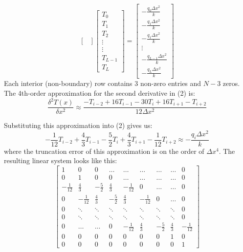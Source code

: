 \documentclass[letterpaper, 12pt]{article}
\begin{document}
\begin{flushleft}
\[\begin{bmatrix}
\end{bmatrix}
\begin{bmatrix}
    T_0 \\
    T_1 \\
    T_2 \\
    \vdots \\
    \vdots \\
    T_{L-1} \\
    T_L
\end{bmatrix}
=
\begin{bmatrix}
    - \frac{q_0 \Delta x^2}{k} \\
    - \frac{q_1 \Delta x^2}{k} \\
    - \frac{q_1 \Delta x^2}{k} \\
    \vdots \\
    - \frac{q_{L-1} \Delta x^2}{k} \\
    - \frac{q_L \Delta x^2}{k}
\end{bmatrix}
\]
Each interior (non-boundary) row contains 3 non-zero entries and $N-3$ zeros.
\vskip 5mm
The 4th-order approximation for the second derivative in (2) is:
\begin{equation}
    \frac{\delta^2 T(x)}{\delta x^2} \approx \frac{-T_{i-2} + 16T_{i-1} - 30T_i + 16T_{i+1} -T_{i+2}}{12 \Delta x^2}
\end{equation}

Substituting this approximation into (2) gives us:
\begin{equation}
    -\frac{1}{12}T_{i-2} + \frac{4}{3}T_{i-1} - \frac{5}{2}T_i + \frac{4}{3}T_{i+1} -\frac{1}{12}T_{i+2} \approx - \frac{q_i \Delta x^2}{k}
\end{equation}
where the truncation error of this approximation is on the order of $\Delta x^4$. The resulting linear system looks like this:
\[
\begin{bmatrix}
    1 & 0 & 0 & \hdots & \hdots & \hdots & \hdots & \hdots & 0\\
    0 & 1 & 0 & 0 & \hdots & \hdots & \hdots & \hdots & 0\\
    -\frac{1}{12} & \frac{4}{3} & -\frac{5}{2} & \frac{4}{3} & -\frac{1}{12} & 0 & \hdots &  \hdots & 0\\
    0 & -\frac{1}{12} & \frac{4}{3} & -\frac{5}{2} & \frac{4}{3} & -\frac{1}{12} & 0 & \hdots &  0\\
    0 & \ddots & \ddots & \ddots & \ddots & \ddots & \ddots & \ddots & 0 \\
    0 & \ddots & \ddots & \ddots & \ddots & \ddots & \ddots & \ddots & 0 \\
    0 & \hdots &  \hdots & 0 & -\frac{1}{12} & \frac{4}{3} & -\frac{5}{2} & \frac{4}{3} & -\frac{1}{12}\\
    0 & 0 & 0 & 0 & 0 & 0 & 0 & 1 & 0 \\
    0 & 0 & 0 & 0 & 0 & 0 & 0 & 0 & 1
    

\end{bmatrix}\]
\end{flushleft}
\end{document}
